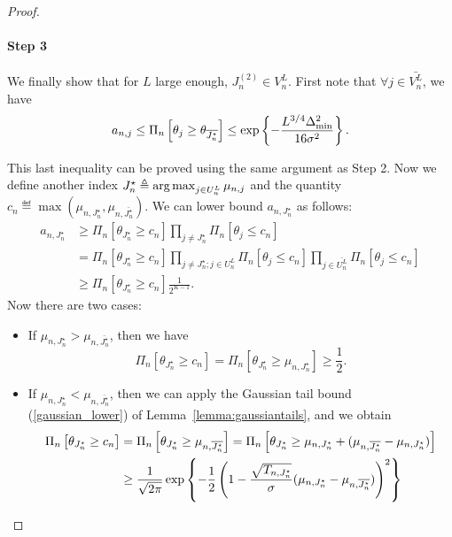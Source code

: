 \begin{proof}
    \paragraph{Step 3} We finally show that for $L$ large enough, $J_n^{(2)} \in V_n^L$. First note that $\forall j \in \bar{V_n^L}$, we have
    \begin{equation}
                a_{n,j} \leq \Pi_{n}\left[\theta_j \geq \theta_{\overline{J_n^{\star}}}\right] \leq \exp\left\{-\frac{L^{3/4}\Delta_{\text{min}}^2}{16\sigma^2}\right\}. \label{eq:upper_bound_anj_explo}
    \end{equation}

    This last inequality can be proved using the same argument as Step 2. Now we define another index $J_n^\star \triangleq \operatorname*{arg\,max}_{j\in U_n^L}\mu_{n,j}$ and the quantity $c_n \eqdef \max(\mu_{n,J_n^\star},\mu_{n,\bar{J_n^\star}})$. We can lower bound $a_{n,J_n^\star}$ as follows:
    \begin{align*}
        a_{n,J_n^\star} &\geq \Pi_{n}\left[\theta_{J_n^\star}\geq c_n\right]\prod_{j\neq J_n^\star}\Pi_{n}\left[\theta_j\leq c_n\right]\\
                             &= \Pi_{n}\left[\theta_{J_n^\star}\geq c_n\right]\prod_{j\neq J_n^\star;j\in U_n^L}\Pi_{n}\left[\theta_j\leq c_n\right]\prod_{j\in \bar{U_n^L}}\Pi_{n}\left[\theta_j\leq c_n\right]\\
                             &\geq \Pi_{n}\left[\theta_{J_n^\star}\geq c_n\right] \frac{1}{2^{K-1}}.
    \end{align*}
    Now there are two cases:
    \begin{itemize}
        \item If $\mu_{n,J_n^\star} > \mu_{n,\bar{J_n^\star}}$, then we have
        \[
            \Pi_{n}\left[\theta_{J_n^\star}\geq c_n\right] = \Pi_{n}\left[\theta_{J_n^\star}\geq \mu_{n,J_n^\star}\right] \geq \frac{1}{2}.
        \]
        \item If $\mu_{n,J_n^\star} < \mu_{n,\bar{J_n^\star}}$, then we can apply the Gaussian tail bound (\ref{gaussian_lower}) of Lemma~\ref{lemma:gaussiantails}, and we obtain
        \begin{align*}
            \Pi_{n}\left[\theta_{J_n^\star}\geq c_n\right] &= \Pi_{n}\left[\theta_{J_n^\star}\geq \mu_{n,\bar{J_n^\star}}\right] =
            \Pi_{n}\left[\theta_{J_n^\star}\geq \mu_{n,J_n^\star} + (\mu_{n,\bar{J_n^\star}}-\mu_{n,J_n^\star})\right]\\
                                            &\geq
            \frac{1}{\sqrt{2\pi}} \expp{-\frac{1}{2}\left( 1-\frac{\sqrt{T_{n,J_n^\star}}}{\sigma}(\mu_{n,J_n^\star}-\mu_{n,\bar{J_n^\star}}) \right)^2}\\

\end{align*}
\end{itemize}
\end{proof}
